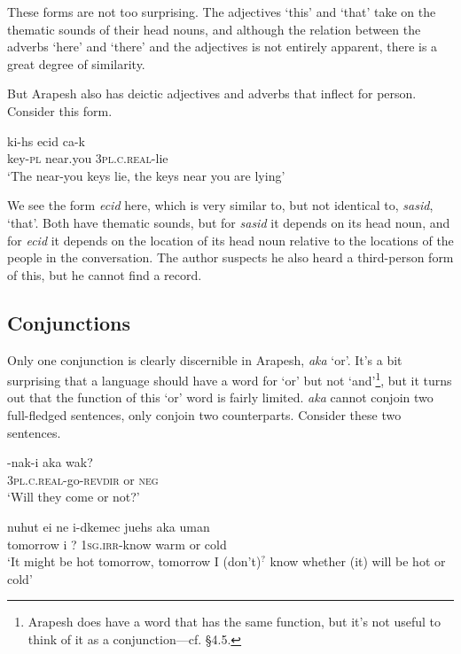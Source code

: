 \documentclass[pdftex,12pt,letterpaper]{article}
\let\ipa\textipa
\let\enya\textltailn
\begin{document}
\noindent These forms are not too surprising. The adjectives `this' and `that' take on the thematic sounds of their head nouns, and although the relation between the adverbs `here' and `there' and the adjectives is not entirely apparent, there is a great degree of similarity.

But Arapesh also has deictic adjectives and adverbs that inflect for person. Consider this form.

\begin{exe}
\ex\gll ki-h\ipa{@}s \ipa{\enya}ecid\ipa{@} ca-k\ipa{@s} \\
key-\textsc{pl} near.you \textsc{3pl.c.real}-lie \\
\trans `The near-you keys lie, the keys near you are lying'
\end{exe}

\noindent We see the form \emph{\ipa{\enya}ecid\ipa{@}} here, which is very similar to, but not identical to, \emph{sasid\ipa{@}}, `that'. Both have thematic sounds, but for \emph{sasid\ipa{@}} it depends on its head noun, and for \emph{\ipa{\enya}ecid\ipa{@}} it depends on the location of its head noun relative to the locations of the people in the conversation. The author suspects he also heard a third-person form of this, but he cannot find a record.

\subsection{Conjunctions}
Only one conjunction is clearly discernible in Arapesh, \emph{aka} `or'. It's a bit surprising that a language should have a word for `or' but not `and'\footnote{Arapesh does have a word that has the same function, but it's not useful to think of it as a conjunction---cf. \S 4.5.}, but it turns out that the function of this `or' word is fairly limited. \emph{aka} cannot conjoin two full-fledged sentences, only conjoin two counterparts. Consider these two sentences.

\begin{exe}
\ex 
\gll \ipa{c@}-nak-i aka wak? \\
\textsc{3pl.c.real}-go-\textsc{revdir} or \textsc{neg}\\
`Will they come or not?'

\ex 
\gll nuhut ei ne i-d\ipa{1}kemec jueh\ipa{@}s aka \ipa{\enya}uman\ipa{@g@s} \\
tomorrow i ? \textsc{1sg.irr}-know warm or cold  \\
\trans `It might be hot tomorrow, tomorrow I (don't)$^?$ know whether (it) will be hot or cold'
\end{exe}
\end{document}
